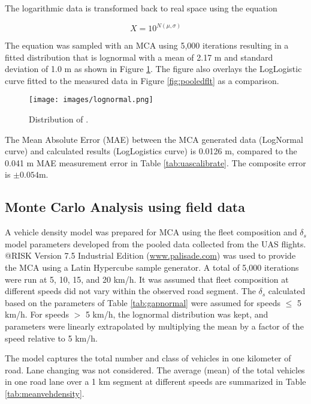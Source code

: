The logarithmic data is transformed back to real space using the equation

\begin{equation}
\label{inverse-10}
X = 10^{N(\mu,\sigma)}
\end{equation}

The equation was sampled with an MCA using 5,000 iterations resulting in a fitted distribution that is lognormal with a mean of 2.17 m and standard deviation of 1.0 m as shown in Figure \ref{fig:lognormal}.  The figure also overlays the LogLogistic curve fitted to the measured data in Figure \ref{fig:pooledflt} as a comparison.
 
\begin{figure}[H]
\centering
\texttt{[image: images/lognormal.png]} 
\caption{Distribution of .}
\label{fig:lognormal}
\end{figure}

The Mean Absolute Error (MAE) between the MCA generated data (LogNormal curve) and calculated results (LogLogistics curve) is 0.0126 m, compared to the 0.041 m MAE measurement error in Table \ref{tab:uascalibrate}. The composite error is $\pm 0.054$m.

\subsection{Monte Carlo Analysis using field data}
A vehicle density model was prepared for MCA using the fleet composition and $\delta_{s}$ model parameters developed from the pooled data collected from the UAS flights. @RISK Version 7.5 Industrial Edition (\url{www.palisade.com}) was used to provide the MCA using a Latin Hypercube sample generator.  A total of 5,000 iterations were run at 5, 10, 15, and 20 km/h. It was assumed that fleet composition at different speeds did not vary within the observed road segment. The $\delta_{s}$ calculated based on the parameters of Table \ref{tab:gapnormal} were assumed for speeds $\leq$ 5 km/h. For speeds $>$ 5 km/h, the lognormal distribution was kept, and parameters were linearly extrapolated by multiplying the mean by a factor of the speed relative to 5 km/h.  

The model captures the total number and class of vehicles in one kilometer of road.  Lane changing was not considered. The average (mean) of the total vehicles in one road lane over a 1 km segment at different speeds are summarized in Table \ref{tab:meanvehdensity}.

